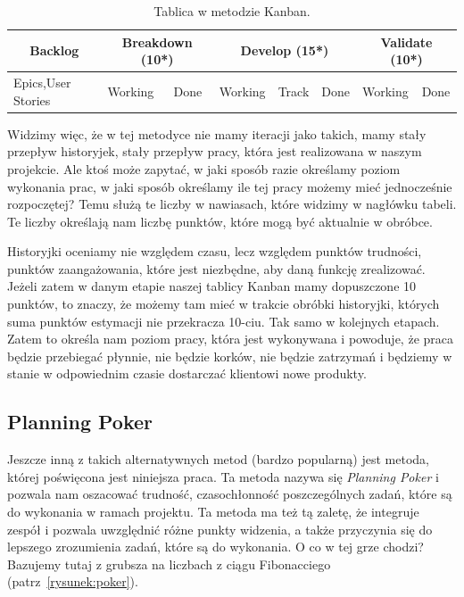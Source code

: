 \begin{table}
	\centering\caption{Tablica w metodzie Kanban.}\label{tabela:kanban}
	\begin{tabular}{*8{l} }%
	\toprule
	\multicolumn{1}{|c|}{\textbf{Backlog}} &\multicolumn{2}{|c|}{\textbf{Breakdown (10*)}} & \multicolumn{3}{|c|}{\textbf{Develop (15*)}} & \multicolumn{2}{|c|}{\textbf{Validate (10*)}} \\
	\midrule
	Epics,User Stories & Working
	& Done & Working & Track & Done & Working & Done \\
	\bottomrule
	\end{tabular}
\end{table}

Widzimy więc, że w tej metodyce nie mamy iteracji jako takich, mamy stały przepływ historyjek,
stały przepływ pracy, która jest realizowana w naszym projekcie.
Ale ktoś może zapytać, w jaki sposób razie określamy poziom wykonania prac, w jaki sposób określamy
ile tej pracy możemy mieć jednocześnie rozpoczętej?
Temu służą te liczby w nawiasach, które widzimy w nagłówku tabeli.
Te liczby określają nam liczbę punktów, które mogą być aktualnie w obróbce.

Historyjki oceniamy nie względem czasu, lecz względem punktów trudności,
punktów zaangażowania, które jest niezbędne, aby daną funkcję zrealizować.
Jeżeli zatem w danym etapie naszej tablicy Kanban mamy dopuszczone 10 punktów,
to znaczy, że możemy tam mieć w trakcie obróbki historyjki,
których suma punktów estymacji nie przekracza 10-ciu. Tak samo w kolejnych etapach.
Zatem to określa nam poziom pracy, która jest wykonywana i powoduje, że praca będzie przebiegać płynnie,
nie będzie korków, nie będzie zatrzymań i będziemy w stanie w odpowiednim czasie dostarczać klientowi
nowe produkty.

\subsection{Planning Poker}

Jeszcze inną z takich alternatywnych metod (bardzo popularną) jest metoda,
której poświęcona jest niniejsza praca.
Ta metoda nazywa się \textit{Planning Poker} i pozwala nam oszacować trudność,
czasochłonność poszczególnych zadań, które są do wykonania w ramach projektu.
Ta metoda ma też tą zaletę, że integruje zespół i pozwala uwzględnić różne punkty widzenia,
a także przyczynia się do lepszego zrozumienia zadań, które są do wykonania.
O co w tej grze chodzi? Bazujemy tutaj z grubsza na liczbach z ciągu Fibonacciego (patrz~\ref{rysunek:poker}).

